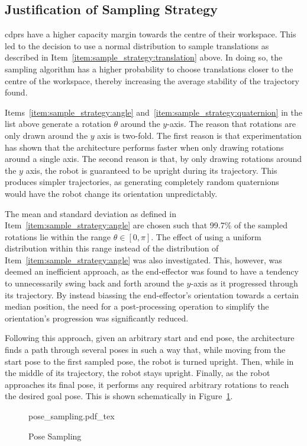 	\subsection{Justification of Sampling Strategy}%
	\label{sec:justification_of_sampling_strategy}

		\glspl{cdpr} have a higher capacity margin towards the centre of
		their workspace. This led to the decision
		to use a normal distribution to sample translations as described in
		Item~\ref{item:sample_strategy:translation} above. In doing so,
		the sampling algorithm has a higher probability to choose
		translations closer to the centre of the workspace, thereby
		increasing the average stability of the trajectory found.

		Items~\ref{item:sample_strategy:angle}
		and~\ref{item:sample_strategy:quaternion} in the list above generate
		a rotation $\theta$ around the $y$-axis. The reason that rotations
		are only drawn around the $y$ axis is two-fold. The first reason is
		that experimentation has shown that the architecture performs faster
		when only drawing rotations around a single axis. The second reason is that, by only drawing rotations
		around the $y$ axis, the robot is guaranteed to be upright during
		its trajectory. This produces simpler trajectories, as generating
		completely random quaternions would have the robot change its
		orientation unpredictably.

		The mean and standard deviation as defined in
		Item~\ref{item:sample_strategy:angle} are chosen such that 99.7\% of
		the sampled rotations lie within the range $\theta \in [0, \pi]$.
		The effect of using a uniform distribution within this range instead
		of the distribution of Item~\ref{item:sample_strategy:angle} was
		also investigated. This, however, was deemed an inefficient
		approach, as the end-effector was found to have a tendency to
		unnecessarily swing back and forth around the $y$-axis as it
		progressed through its trajectory. By instead biassing the
		end-effector's orientation towards a certain median position, the
		need for a post-processing operation to simplify the orientation's
		progression was significantly reduced.

		Following this approach, given an arbitrary start and end pose, the
		architecture finds a path through several poses in such a way that,
		while moving from the start pose to the first sampled pose, the
		robot is turned upright. Then, while in the middle of its
		trajectory, the robot stays upright. Finally, as the robot
		approaches its final pose, it performs any required arbitrary
		rotations to reach the desired goal pose. This is shown
		schematically in Figure~\ref{fig:pose_sampling}.

		\begin{figure}[hb]
			\centering
			\def\svgwidth{\columnwidth}
			{pose_sampling.pdf_tex}
			\caption{Pose Sampling}%
			\label{fig:pose_sampling}
		\end{figure}


